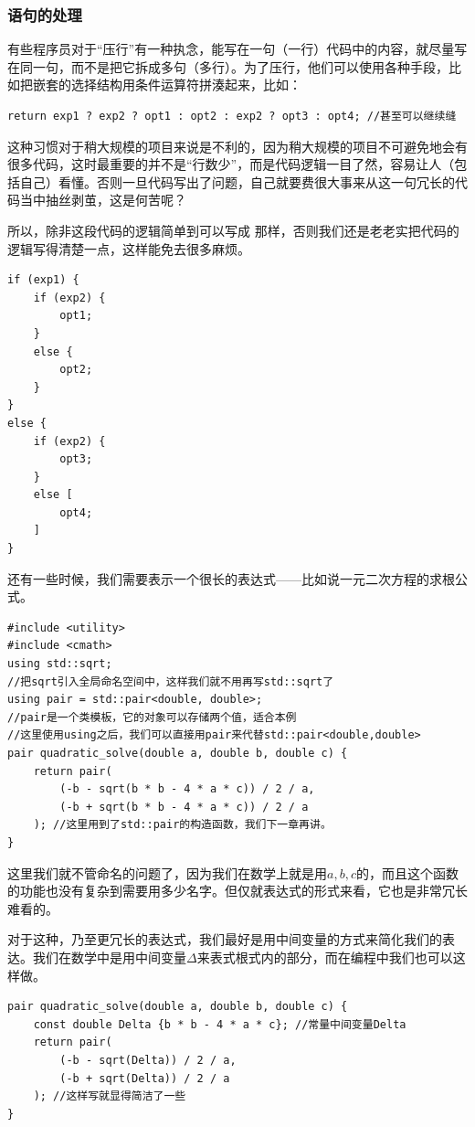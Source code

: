 \subsubsection*{语句的处理}
有些程序员对于``压行''有一种执念，能写在一句（一行）代码中的内容，就尽量写在同一句，而不是把它拆成多句（多行）。为了压行，他们可以使用各种手段，比如把嵌套的选择结构用条件运算符拼湊起来，比如：
\begin{lstlisting}
return exp1 ? exp2 ? opt1 : opt2 : exp2 ? opt3 : opt4; //甚至可以继续缝
\end{lstlisting}\par
这种习惯对于稍大规模的项目来说是不利的，因为稍大规模的项目不可避免地会有很多代码，这时最重要的并不是``行数少''，而是代码逻辑一目了然，容易让人（包括自己）看懂。否则一旦代码写出了问题，自己就要费很大事来从这一句冗长的代码当中抽丝剥茧，这是何苦呢？\par
所以，除非这段代码的逻辑简单到可以写成 \lstinline@max@ 那样，否则我们还是老老实把代码的逻辑写得清楚一点，这样能免去很多麻烦。
\begin{lstlisting}
if (exp1) {
    if (exp2) {
        opt1;
    }
    else {
        opt2;
    }
}
else {
    if (exp2) {
        opt3;
    }
    else [
        opt4;
    ]
}
\end{lstlisting}\par
还有一些时候，我们需要表示一个很长的表达式——比如说一元二次方程的求根公式。
\begin{lstlisting}
#include <utility>
#include <cmath>
using std::sqrt;
//把sqrt引入全局命名空间中，这样我们就不用再写std::sqrt了
using pair = std::pair<double, double>;
//pair是一个类模板，它的对象可以存储两个值，适合本例
//这里使用using之后，我们可以直接用pair来代替std::pair<double,double>
pair quadratic_solve(double a, double b, double c) {
    return pair(
        (-b - sqrt(b * b - 4 * a * c)) / 2 / a,
        (-b + sqrt(b * b - 4 * a * c)) / 2 / a
    ); //这里用到了std::pair的构造函数，我们下一章再讲。
}
\end{lstlisting}
这里我们就不管命名的问题了，因为我们在数学上就是用$a,b,c$的，而且这个函数的功能也没有复杂到需要用多少名字。但仅就表达式的形式来看，它也是非常冗长难看的。\par
对于这种，乃至更冗长的表达式，我们最好是用中间变量的方式来简化我们的表达。我们在数学中是用中间变量$\Delta$来表式根式内的部分，而在编程中我们也可以这样做。
\begin{lstlisting}
pair quadratic_solve(double a, double b, double c) {
    const double Delta {b * b - 4 * a * c}; //常量中间变量Delta
    return pair(
        (-b - sqrt(Delta)) / 2 / a,
        (-b + sqrt(Delta)) / 2 / a
    ); //这样写就显得简洁了一些
}
\end{lstlisting}\par
